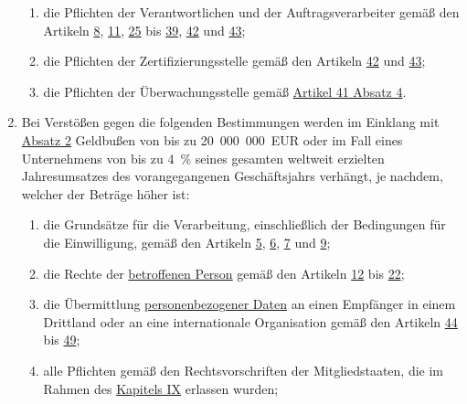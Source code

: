 \begin{enumerate}
  \begin{enumerate}
  
    \item die Pflichten der Verantwortlichen und der Auftragsverarbeiter gemäß den Artikeln \hyperref[ch:8]{8},
     \hyperref[ch:11]{11}, \hyperref[ch:25]{25} bis \hyperref[ch:39]{39}, \hyperref[ch:42]{42} und \hyperref[ch:43]{43};
    \label{itm:83-4a}

    \item die Pflichten der Zertifizierungsstelle gemäß den Artikeln \hyperref[ch:42]{42} und \hyperref[ch:43]{43};
    \label{itm:83-4b}

    \item die Pflichten der Überwachungsstelle gemäß \hyperref[itm:41-4]{Artikel 41 Absatz 4}.
    \label{itm:83-4c}

  \end{enumerate}

  \item Bei Verstößen gegen die folgenden Bestimmungen werden im Einklang mit \hyperref[itm:83-2]{Absatz 2} Geldbußen
   von bis zu 20~000~000~EUR oder im Fall eines Unternehmens von bis zu 4~\% seines gesamten weltweit erzielten
   Jahresumsatzes des vorangegangenen Geschäftsjahrs verhängt, je nachdem, welcher der Beträge höher ist:
  \label{itm:83-5}

  \begin{enumerate}
  
    \item die Grundsätze für die Verarbeitung, einschließlich der Bedingungen für die Einwilligung, gemäß den Artikeln
     \hyperref[ch:5]{5}, \hyperref[ch:6]{6}, \hyperref[ch:7]{7} und \hyperref[ch:9]{9};
    \label{itm:83-5a}

    \item die Rechte der \hyperref[itm:04-1]{betroffenen Person} gemäß den Artikeln \hyperref[ch:12]{12} bis \hyperref[ch:22]{22};
    \label{itm:83-5b}

    \item die Übermittlung \hyperref[itm:04-1]{personenbezogener Daten} an einen Empfänger in einem Drittland oder an eine internationale
     Organisation gemäß den Artikeln \hyperref[ch:44]{44} bis \hyperref[ch:49]{49};
    \label{itm:83-5c}

    \item alle Pflichten gemäß den Rechtsvorschriften der Mitgliedstaaten, die im Rahmen des \hyperref[part:9]
     {Kapitels IX} erlassen wurden;
    \label{itm:83-5d}


\end{enumerate}
\end{enumerate}
